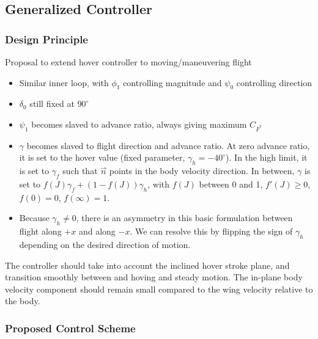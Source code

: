 \documentclass[11pt,letterpaper]{article}
\begin{document}
\subsection{Generalized Controller}\label{sec:general-controller}

\subsubsection{Design Principle}

Proposal to extend hover controller to moving/maneuvering flight

\begin{itemize}
    \item Similar inner loop, with $\phi_1$ controlling magnitude and $\psi_0$ controlling direction
    \item $\delta_0$ still fixed at $90^\circ$
    \item $\psi_1$ becomes slaved to advance ratio, always giving maximum $C_{F^*}$
    \item $\gamma$ becomes slaved to flight direction and advance ratio. At zero advance ratio, it is set to the hover value (fixed parameter, $\gamma_h = -40^\circ$). In the high limit, it is set to $\gamma_f$ such that $\vec{n}$ points in the body velocity direction. In between, $\gamma$ is set to $f(J) \gamma_f + (1 - f(J)) \gamma_h$, with $f(J)$ between 0 and 1, $f'(J) \geq 0$, $f(0) = 0$, $f(\infty) = 1$.
    \item Because $\gamma_h \neq 0$, there is an asymmetry in this basic formulation between flight along $+x$ and along $-x$. We can resolve this by flipping the sign of $\gamma_h$ depending on the desired direction of motion.
\end{itemize}

The controller should take into account the
inclined hover stroke plane, and transition
smoothly between and hoving and steady motion.
The in-plane body velocity component should
remain small compared to the wing velocity relative to the body.

\subsubsection{Proposed Control Scheme}
\end{document}
